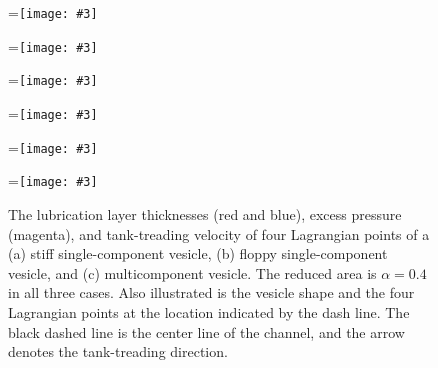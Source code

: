 \documentclass[twoside,twocolumn,9pt]{article}
\newcommand{\subfigimg}[3][,]{%
  \setbox1=\hbox{\texttt{[image: \#3]}}%
  \leavevmode\rlap{\usebox1}%
  \rlap{\hspace*{0pt}\raisebox{\dimexpr\ht1-0\baselineskip}{\bf
  \normalsize #2}}%
  \phantom{\usebox1}%
}
\begin{document}
\begin{figure}[t]
  \centering
  \subfigimg[width=0.3\linewidth]{(a)}{figures/Layer_Size_RAp4_SC.pdf}
  \subfigimg[width=0.3\linewidth]{(b)}{figures/Layer_Size_RAp4_SCp55.pdf}
  \subfigimg[width=0.3\linewidth]{(c)}{figures/Layer_Size_RAp4_MCp5.pdf}
  \subfigimg[width=0.3\linewidth,trim=0cm 6cm 28cm 0cm,clip=true]{}{figures/TankTreadingFigs_composite_SC.pdf}
  \subfigimg[width=0.3\linewidth,trim=0cm 6cm 28cm
  0cm,clip=true]{}{figures/TankTreadingFigs_composite_SCp55.pdf}
  \subfigimg[width=0.3\linewidth,trim=0cm 6cm 28cm
  0cm,clip=true]{}{figures/TankTreadingFigs_composite_MCp5.pdf}
  \caption{\label{fig:lubricationComposite} \small The lubrication layer
  thicknesses (red and blue), excess pressure (magenta), and
  tank-treading velocity of four Lagrangian points of a (a) stiff
  single-component vesicle, (b) floppy single-component vesicle, and (c)
  multicomponent vesicle. The reduced area is $\alpha = 0.4$ in all
  three cases. Also illustrated is the vesicle shape and the four
  Lagrangian points at the location indicated by the dash line. The
  black dashed line is the center line of the channel, and the arrow
  denotes the tank-treading direction.}
\end{figure}
\end{document}
